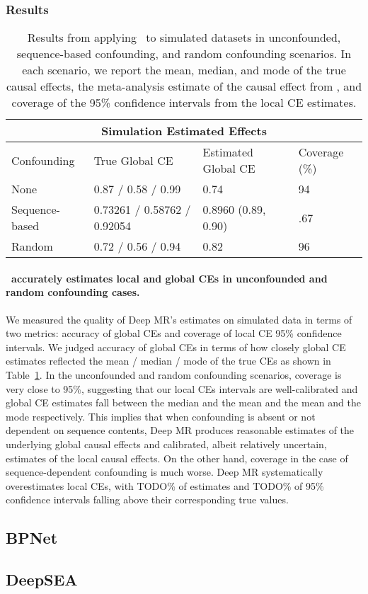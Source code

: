 \subsubsection{Results}%
\label{ssub:sim_results}
\begin{table}
    \begin{tabular}{ |p{3cm}||p{5cm}|p{5cm}|p{3cm}| }
     \hline
     \multicolumn{4}{|c|}{Simulation Estimated Effects} \\
     \hline
     Confounding & True Global CE & Estimated Global CE & Coverage (\%) \\
     \hline
     None & 0.87 / 0.58 / 0.99 & 0.74 & 94   \\
     \hline
     Sequence-based & 0.73261 / 0.58762 / 0.92054 & 0.8960 (0.89, 0.90) &  .67 \\
     \hline
     Random & 0.72 / 0.56 / 0.94 & 0.82 & 96 \\
     \hline
    \end{tabular}
    \caption{Results from applying \method\ to simulated datasets in unconfounded, sequence-based confounding, and random confounding scenarios. In each scenario, we report the mean, median, and mode of the true causal effects, the meta-analysis estimate of the causal effect from \method, and coverage of the 95\% confidence intervals from the local CE estimates.}
    \label{tab:sim_results}

\end{table}

\paragraph{\method\ accurately estimates local and global CEs in unconfounded and random confounding cases.}%
\label{par:sim_res_1}
We measured the quality of Deep MR's estimates on simulated data in terms of two metrics: accuracy of global CEs and coverage of local CE 95\% confidence intervals. We judged accuracy of global CEs in terms of how closely global CE estimates reflected the mean / median / mode of the true CEs as shown in Table~\ref{tab:sim_results}. In the unconfounded and random confounding scenarios, coverage is very close to 95\%, suggesting that our local CEs intervals are well-calibrated and global CE estimates fall between the median and the mean and the mean and the mode respectively. This implies that when confounding is absent or not dependent on sequence contents, Deep MR produces reasonable estimates of the underlying global causal effects and calibrated, albeit relatively uncertain, estimates of the local causal effects. On the other hand, coverage in the case of sequence-dependent confounding is much worse. Deep MR systematically overestimates local CEs, with TODO\% of estimates and TODO\% of 95\% confidence intervals falling above their corresponding true values.

\subsection{BPNet}

\subsection{DeepSEA}


